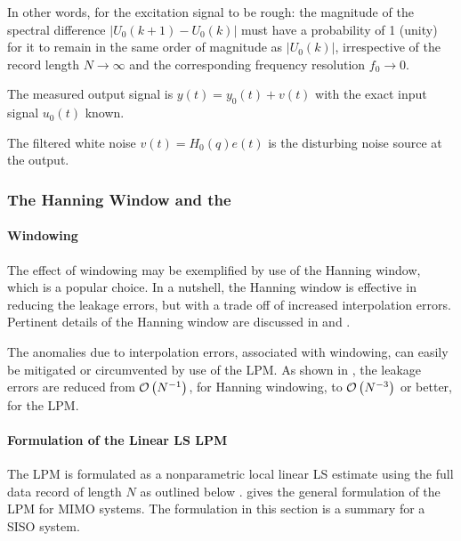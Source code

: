 In other words, for the excitation signal to be rough: the magnitude of the spectral difference $|U_0(k+1) - U_0(k)|$ must have a probability of 1 (unity) for it to remain in the same order of magnitude as $|U_0(k)|$, irrespective of the record length $N\rightarrow\infty$ and the corresponding  frequency resolution $f_0\rightarrow{0}$.


\begin{assumption}
The measured output signal is $y(t) = y_0(t) + v(t)$ with the exact input signal $u_0(t)$ known.
\end{assumption}


\begin{assumption}
The filtered white noise $v(t) = H_0(q)e(t)$ is the disturbing noise source at the output.
\end{assumption}


\subsubsection{The Hanning Window and the }\label{se:LPMFRFest}%
\paragraph{Windowing}
The effect of windowing may be  exemplified by use of the Hanning window, which is a popular choice.
In a nutshell, the Hanning window is effective in reducing  the leakage errors, but  with a trade off of increased interpolation errors. 
Pertinent details of the Hanning window are discussed in \citep{Schoukens2006LPM,Antoni2007FRF,Schoukens2009LPM,Wellstead1981} and \citep{Harris1978}.

The anomalies due to interpolation errors, associated with windowing, can easily be mitigated or circumvented by use of the \gls{LPM}. As shown in \citep{Pintelon2012}, the leakage errors are reduced from  $\mathcal{O} \left( {N}^{-1} \right)$, for Hanning windowing, to $\mathcal{O} \left( {N}^{-3} \right)$ or better, for the \gls{LPM}.


\paragraph{Formulation of the Linear LS LPM}
The \gls{LPM} is formulated as a nonparametric local linear \gls{LS} estimate using the full data record of length $N$ as outlined below \citep{Schoukens2009LPM}.
\citet[Section 7.2.2]{Pintelon2012} gives the general formulation of the \gls{LPM} for \gls{MIMO} systems.
The formulation in this section is a summary for a \gls{SISO} system.

